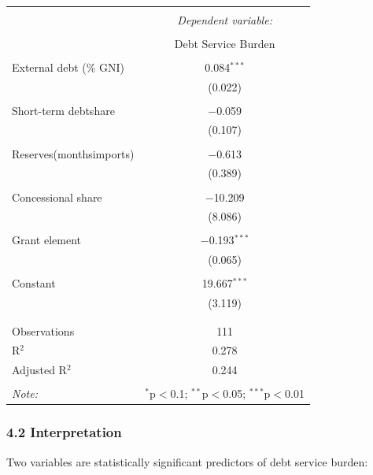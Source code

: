 \documentclass[
  letterpaper,
  DIV=11,
  numbers=noendperiod]{scrartcl}
\begin{document}
\begin{table}[!htbp] \centering 
  \caption{} 
  \label{} 
\begin{tabular}{@{\extracolsep{5pt}}lc} 
\\[-1.8ex]\hline 
\hline \\[-1.8ex] 
 & \multicolumn{1}{c}{\textit{Dependent variable:}} \\ 
\\[-1.8ex] & Debt Service Burden \\ 
\hline \\[-1.8ex] 
 External debt (\% GNI) & 0.084$^{***}$ \\ 
  & (0.022) \\ 
  & \\ 
 Short-term debtshare & $-$0.059 \\ 
  & (0.107) \\ 
  & \\ 
 Reserves(monthsimports) & $-$0.613 \\ 
  & (0.389) \\ 
  & \\ 
 Concessional share & $-$10.209 \\ 
  & (8.086) \\ 
  & \\ 
 Grant element & $-$0.193$^{***}$ \\ 
  & (0.065) \\ 
  & \\ 
 Constant & 19.667$^{***}$ \\ 
  & (3.119) \\ 
  & \\ 
\hline \\[-1.8ex] 
Observations & 111 \\ 
R$^{2}$ & 0.278 \\ 
Adjusted R$^{2}$ & 0.244 \\ 
\hline 
\hline \\[-1.8ex] 
\textit{Note:}  & \multicolumn{1}{r}{$^{*}$p$<$0.1; $^{**}$p$<$0.05; $^{***}$p$<$0.01} \\ 
\end{tabular} 
\end{table}

\subsubsection{4.2 Interpretation}\label{interpretation}

Two variables are statistically significant predictors of debt service
burden:
\end{document}
